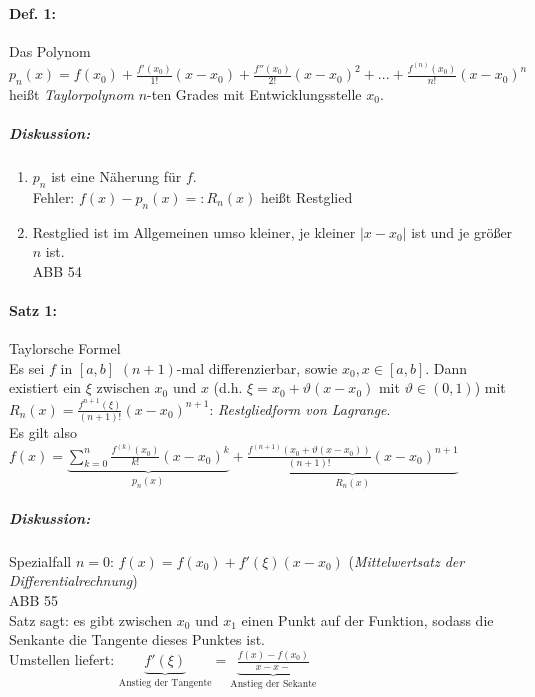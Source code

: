 \paragraph{Def. 1:} Das Polynom $p_n(x)=f(x_0)+\frac{f'(x_0)}{1!}(x-x_0)+\frac{f''(x_0)}{2!}(x-x_0)^2+...+\frac{f^{(n)}(x_0)}{n!}(x-x_0)^n$ heißt \emph{Taylorpolynom} $n$-ten Grades mit Entwicklungsstelle $x_0$.

\subparagraph{Diskussion:} 
\begin{enumerate}
\item $p_n$ ist eine Näherung für $f$.\\
Fehler: $f(x)-p_n(x)=: R_n(x)$ heißt Restglied
\item Restglied ist im Allgemeinen umso kleiner, je kleiner $|x-x_0|$ ist und je größer $n$ ist.\\
ABB 54
\end{enumerate}
\paragraph{Satz 1:} Taylorsche Formel\\
Es sei $f$ in $[a,b]$ $(n+1)$-mal differenzierbar, sowie $x_0,x \in [a,b]$. Dann existiert ein $\xi$ zwischen $x_0$ und $x$ (d.h. $\xi = x_0 + \vartheta (x-x_0)$ mit $\vartheta \in (0,1)$) mit $R_n (x) = \frac{f^{n+1}(\xi)}{(n+1)!}(x-x_0)^{n+1}$: \emph{Restgliedform von Lagrange}.\\
Es gilt also $f(x) = \underbrace{\sum_{k=0}^n \frac{f^{(k)}(x_0)}{k!}(x-x_0)^k}_{p_n(x)} +\underbrace{\frac{f^{(n+1)}(x_0+\vartheta(x-x_0))}{(n+1)!}(x-x_0)^{n+1}}_{R_n(x)}$
\subparagraph{Diskussion:}
Spezialfall $n=0$: $f(x)=f(x_0)+f'(\xi)(x-x_0)$ (\emph{Mittelwertsatz der Differentialrechnung})\\
ABB 55\\
Satz sagt: es gibt zwischen $x_0$ und $x_1$ einen Punkt auf der Funktion, sodass die Senkante die Tangente dieses Punktes ist. \\
Umstellen liefert: $\underbrace{f'(\xi)}_{\text{Anstieg der Tangente}}= \underbrace{\frac{f(x)-f(x_0)}{x-x-}}_{\text{Anstieg der Sekante}}$

